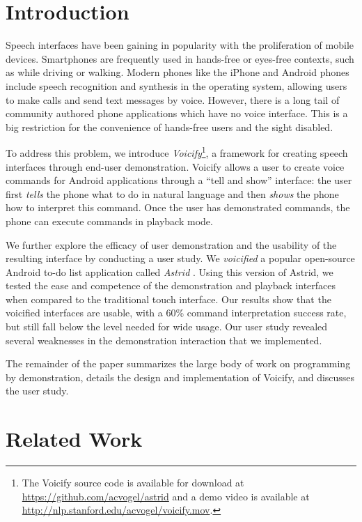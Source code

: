 \documentclass[letterpaper]{article}
\begin{document}
\section{Introduction}
Speech interfaces have been gaining in popularity with the proliferation of mobile devices. Smartphones are
frequently used in hands-free or eyes-free contexts, such as while driving or walking. Modern phones like
the iPhone and Android phones include speech recognition and synthesis in the operating system, allowing
users to make calls and send text messages by voice. However, there is a long tail of community authored
phone applications which have no voice interface. This is a big restriction for the convenience of
hands-free users and the sight disabled. 

To address this problem, we introduce \emph{Voicify}\footnote{The Voicify source code is available for download at \url{https://github.com/acvogel/astrid} and a demo video is available at \url{http://nlp.stanford.edu/acvogel/voicify.mov}.}, a framework for creating speech interfaces 
through end-user demonstration. Voicify allows a user to create voice commands for Android
applications through a ``tell and show'' interface: the user first \emph{tells} the phone what 
to do in natural language and then \emph{shows} the phone how to interpret this command.
Once the user has demonstrated commands, the phone can execute commands in playback mode.

We further explore the efficacy of user demonstration and the usability of the resulting
interface by conducting a user study.  We \emph{voicified} a popular open-source Android to-do list
application called \emph{Astrid} \cite{astrid}. Using this version of Astrid, we tested the ease and
competence of the demonstration and playback interfaces when compared to the traditional touch
interface. Our results show that the voicified interfaces are usable, with a 60\% command interpretation
success rate, but still fall below the level needed for wide usage. Our user study revealed
several weaknesses in the demonstration interaction that we implemented.


The remainder of the paper summarizes the large body of work on programming by demonstration, details
the design and implementation of Voicify, and discusses the user study.





\section{Related Work}
\end{document}
